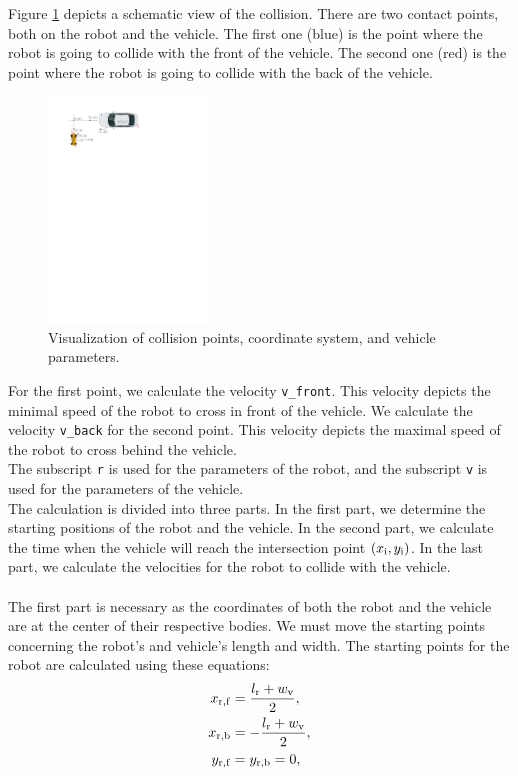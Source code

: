         Figure \ref{fig:collision} depicts a schematic view of the collision. There are two contact points, both on the robot and the vehicle. The first one (blue) is the point where the robot is going to collide with the front of the vehicle. The second one (red) is the point where the robot is going to collide with the back of the vehicle.\\
        \begin{figure}[ht]
            \centering
            \includegraphics[height=6cm]{images/collision.pdf}
            \caption{Visualization of collision points, coordinate system, and vehicle parameters.}
            \label{fig:collision}
        \end{figure}
        \noindent For the first point, we calculate the velocity \texttt{v\_front}. This velocity depicts the minimal speed of the robot to cross in front of the vehicle. We calculate the velocity \texttt{v\_back} for the second point. This velocity depicts the maximal speed of the robot to cross behind the vehicle.\\
        The subscript \texttt{r} is used for the parameters of the robot, and the subscript \texttt{v} is used for the parameters of the vehicle.\\
        The calculation is divided into three parts. In the first part, we determine the starting positions of the robot and the vehicle. In the second part, we calculate the time when the vehicle will reach the intersection point $(x_{\rm{i}}, y_{\rm{i}})$. In the last part, we calculate the velocities for the robot to collide with the vehicle.\\\\
        The first part is necessary as the coordinates of both the robot and the vehicle are at the center of their respective bodies. We must move the starting points concerning the robot's and vehicle's length and width. The starting points for the robot are calculated using these equations:
        \begin{align}
            x_{\rm{r,f}} &= \frac{l_{\rm{r}}+w_{\rm{v}}}{2},\\
            x_{\rm{r,b}} &= -\frac{l_{\rm{r}}+w_{\rm{v}}}{2},\\
            y_{\rm{r,f}} &= y_{\rm{r,b}} = 0,
        \end{align}
